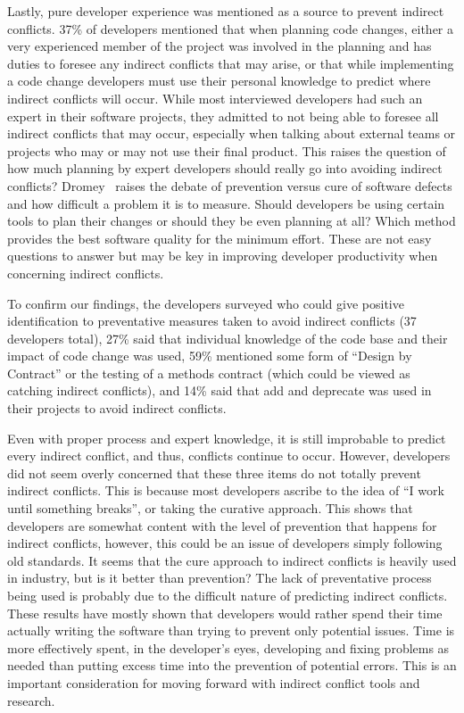 \documentclass[conference]{IEEEtran}
\begin{document}
Lastly, pure developer experience was mentioned
as a source to prevent indirect conflicts. 37\% of developers mentioned that when planning code changes, either a very experienced member
of the project was involved in the planning and has duties to foresee any indirect conflicts that may arise, or that while implementing
a code change developers must use their personal knowledge to predict where indirect conflicts will occur. While most interviewed developers
had such an expert in their software projects, they admitted to not being able to foresee all indirect conflicts that may occur, especially
when talking about external teams or projects who may or may not use their final product. This raises the question of how much planning
by expert developers should really go into avoiding indirect conflicts? Dromey~\cite{Dromey:2003} raises the debate of prevention versus cure of software
defects and how difficult a problem it is to measure. Should developers be using certain tools to plan their changes or should they be even
planning at all? Which method provides the best software quality for the minimum effort. These are not easy questions to answer but may
be key in improving developer productivity when concerning indirect conflicts.

To confirm our findings, the developers surveyed who could give positive identification to preventative measures taken to avoid indirect conflicts (37 developers
total), 27\% said that individual knowledge of the code base and their impact of code change was used, 59\% mentioned some form of ``Design
by Contract'' or the testing of a methods contract (which could be viewed as catching indirect conflicts), and 14\% said that add and
deprecate was used in their projects to avoid indirect conflicts.

Even with proper process and expert knowledge, it is still improbable to predict every indirect conflict, and thus, conflicts 
continue to occur. However, developers did not seem overly concerned that these three items do not totally prevent indirect conflicts. This
is because most developers ascribe to the idea of ``I work until something breaks'', or taking the curative approach. This shows that developers are somewhat content with
the level of prevention that happens for indirect conflicts, however, this could be an issue of developers simply following old standards.
It seems that the cure approach to indirect conflicts is heavily used in industry, but is it better than prevention?
The lack of preventative process being used is probably due to the difficult nature of predicting indirect conflicts. These results have mostly
shown that developers would rather spend their time actually writing the software than trying to prevent only potential issues. Time is
more effectively spent, in the developer's eyes, developing and fixing problems as needed than putting excess time into the prevention of potential errors.
This is an important consideration for moving forward with indirect conflict tools and research.
\end{document}
